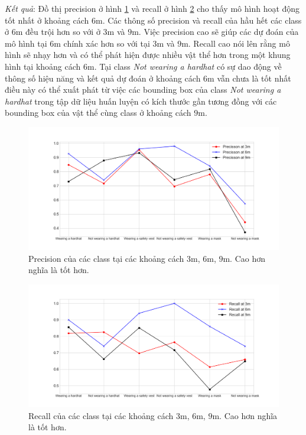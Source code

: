 \emph{Kết quả}: Đồ thị precision ở hình \ref{fig:3_6_9_precision} và recall ở hình \ref{fig:3_6_9_recall} cho thấy mô hình hoạt động tốt nhất ở khoảng cách $6$m. Các thông số precision và recall của hầu hết các class ở $6$m đều trội hơn so với ở $3$m và $9$m. Việc precision cao sẽ giúp các dự đoán của mô hình tại $6$m chính xác hơn so với tại $3$m và $9$m. Recall cao nói lên rằng mô hình sẽ nhạy hơn và có thể phát hiện được nhiều vật thể hơn trong một khung hình tại khoảng cách $6$m. Tại class \emph{Not wearing a hardhat} có sự dao động về thông số hiệu năng và kết quả dự đoán ở khoảng cách $6$m vẫn chưa là tốt nhất điều này có thể xuất phát từ việc các bounding box của class \emph{Not wearing a hardhat} trong tập dữ liệu huấn luyện có kích thước gần tương đồng với các bounding box của vật thể cùng class ở khoảng cách $9$m.
\begin{figure}[ht!]
	\centerline{\includegraphics[scale=0.5]{images/3_6_9_precision.png}}
  	\caption{Precision của các class tại các khoảng cách {\color{red} 3m}, {\color{blue} $6$m}, {\color{black} $9$m}. Cao hơn nghĩa là tốt hơn.}
  	\label{fig:3_6_9_precision}
\end{figure}
\begin{figure}[ht!]
	\centerline{\includegraphics[scale=0.5]{images/3_6_9_recall.png}}
  	\caption{Recall của các class tại các khoảng cách {\color{red} 3m}, {\color{blue} $6$m}, {\color{black} $9$m}. Cao hơn nghĩa là tốt hơn.}
  	\label{fig:3_6_9_recall}
\end{figure}

